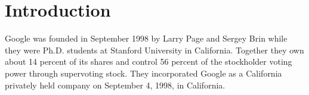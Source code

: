 
\chapter{Introduction}
Google was founded in September 1998 by Larry Page and Sergey Brin while they were Ph.D. students at Stanford University in California. Together they own about 14 percent of its shares and control 56 percent of the stockholder voting power through supervoting stock. They incorporated Google as a California privately held company on September 4, 1998, in California. 
